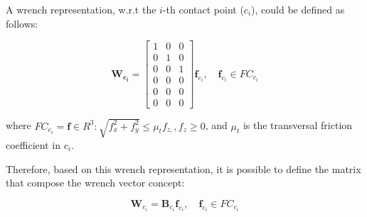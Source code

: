 \begin{figure}[h!]
\end{figure}

A wrench representation, w.r.t the $i$-th contact point ($c_i$), could be defined as follows:

\begin{equation}
\mathbf{W_{c_i}}=\begin{bmatrix}
1 & 0 & 0 \\ 
0 & 1 & 0 \\ 
0 & 0 & 1 \\ 
0 & 0 & 0 \\ 
0 & 0 & 0 \\ 
0 & 0 & 0 
\end{bmatrix} \mathbf{f}_{c_i}, \quad \mathbf{f}_{c_i} \in F C_{c_i}
\end{equation}

\noindent
where $F C_{c_i}=\mathbf{f} \in \!R^3: \sqrt{f_{x}^{2}+f_{y}^{2}} \leq \mu_{t} f_{z,}, f_{z} \geq 0$, and $\mu_t$ is the transversal friction coefficient in $c_i$. 

Therefore, based on this wrench representation, it is possible to define the matrix that compose the wrench vector concept:

\begin{equation}
\mathbf{W}_{c_i}=\mathbf{B}_{c_i} \mathbf{f}_{c_i}, \quad \mathbf{f}_{c_i} \in F C_{c_i}
\end{equation}

